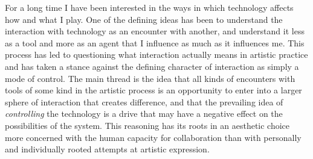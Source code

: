 \documentclass[11pt]{article}
\begin{document}
For a long time I have been interested in the ways in which technology affects how and what I play. One of the defining ideas has been to understand the interaction with technology as an encounter with another, and understand it less as a tool and more as an agent that I influence as much as it influences me. This process has led to questioning what interaction actually means in artistic practice and has taken a stance against the defining character of interaction as simply a mode of control. The main thread is the idea that all kinds of encounters with tools of some kind in the artistic process is an opportunity to enter into a larger sphere of interaction that creates difference, and that the prevailing idea of \emph{controlling} the technology is a drive that may have a negative effect on the possibilities of the system. This reasoning has its roots in an aesthetic choice more concerned with the human capacity for collaboration than with personally and individually rooted attempts at artistic expression.
\end{document}
